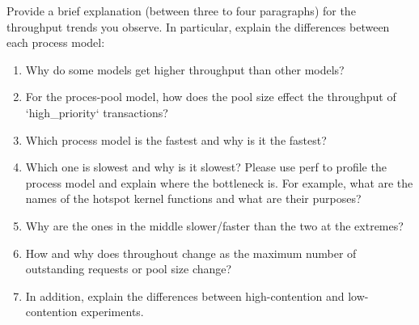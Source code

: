 \documentclass[11pt]{article}
\newcommand{\answer}[1]{}
\newcommand{\answer}[1]{{\color{red}{a: - #1}}}
\begin{document}
Provide a brief explanation (between three to four paragraphs) for the throughput trends you observe. In particular, explain the differences between each process model:
\begin{enumerate}
    \item Why do some models get higher throughput than other models? \\
    \answer{your answer here...}
    \vspace{10mm}

    \item For the proces-pool model, how does the pool size effect the throughput of `high_priority` transactions? \\
    \answer{your answer here...}
    \vspace{10mm}
    
    \item Which process model is the fastest and why is it the fastest?\\
    \answer{your answer here...}
    \vspace{10mm}
    
    \item Which one is slowest and why is it slowest? Please use perf to profile the process model and explain where the bottleneck is. For example, what are the names of the hotspot kernel functions and what are their purposes?\\
    \answer{your answer here...}
    \vspace{10mm}
    
    
    \item Why are the ones in the middle slower/faster than the two at the extremes?\\
    \answer{your answer here...}
    \vspace{10mm}
    
    
    \item How and why does throughout change as the maximum number of outstanding requests or pool size change?\\
    \answer{your answer here...}
    \vspace{10mm}
    
    
    \item In addition, explain the differences between high-contention and low-contention experiments.
    \answer{your answer here...}\\
    \vspace{10mm}

\end{enumerate}
\end{document}
